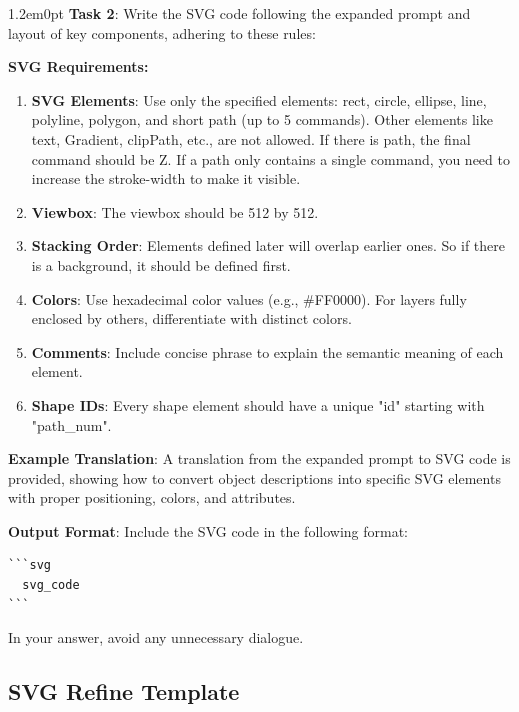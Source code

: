 \documentclass[10pt,a4paper]{article}
\newenvironment{bodytext}{\begin{adjustwidth}{1.2em}{0pt}}{\end{adjustwidth}}
\begin{document}
\begin{bodytext}
\textbf{Task 2}: Write the SVG code following the expanded prompt and layout of key components, adhering to these rules:

\textbf{SVG Requirements:}
\begin{enumerate}
\item \textbf{SVG Elements}: Use only the specified elements: rect, circle, ellipse, line, polyline, polygon, and short path (up to 5 commands). Other elements like text, Gradient, clipPath, etc., are not allowed. If there is path, the final command should be Z. If a path only contains a single command, you need to increase the stroke-width to make it visible.
\item \textbf{Viewbox}: The viewbox should be 512 by 512.
\item \textbf{Stacking Order}: Elements defined later will overlap earlier ones. So if there is a background, it should be defined first.
\item \textbf{Colors}: Use hexadecimal color values (e.g., \#FF0000). For layers fully enclosed by others, differentiate with distinct colors.
\item \textbf{Comments}: Include concise phrase to explain the semantic meaning of each element.
\item \textbf{Shape IDs}: Every shape element should have a unique "id" starting with "path\_num".
\end{enumerate}

\textbf{Example Translation}: A translation from the expanded prompt to SVG code is provided, showing how to convert object descriptions into specific SVG elements with proper positioning, colors, and attributes.

\textbf{Output Format}: Include the SVG code in the following format:
\begin{verbatim}
```svg
  svg_code
```
\end{verbatim}

In your answer, avoid any unnecessary dialogue.
\end{bodytext}

\subsection{SVG Refine Template}
\end{document}
